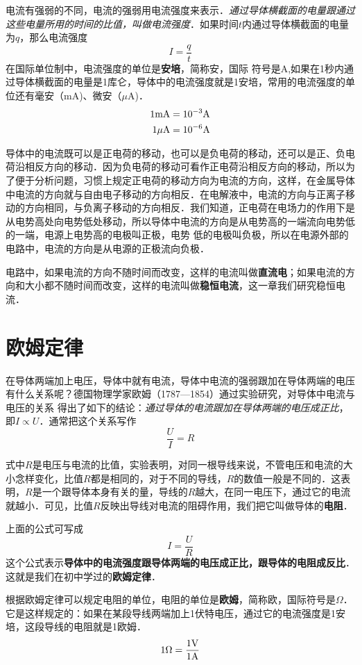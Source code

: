 电流有强弱的不同，电流的强弱用电流强度来表示．\textit{通过导体横截面的电量跟通过这些电量所用的时间的比值，叫做电流强度}．如果时间$t$内通过导体横截面的电量为$q$，那么电流强度
\[I=\frac{q}{t} \]
在国际单位制中，电流强度的单位是\textbf{安培}，简称安，国际
符号是A,如果在1秒内通过导体横截面的电量是1库仑，导体中的电流强度就是1安培，常用的电流强度的单位还有毫安（mA)、微安（$\mu$A)．
\[\begin{split}
    1{\rm mA}&= 10^{-3}{\rm A}\\
    1{\rm \mu A}&=10^{-6}{\rm A}
\end{split}\]

导体中的电流既可以是正电荷的移动，也可以是负电荷的移动，还可以是正、负电荷沿相反方向的移动．因为负电荷的移动可看作正电荷沿相反方向的移动，所以为了便于分析问题，习惯上规定正电荷的移动方向为电流的方向，这样，在金属导体中电流的方向就与自由电子移动的方向相反．在电解液中，电流的方向与正离子移动的方向相同，与负离子移动的方向相反．我们知道，正电荷在电场力的作用下是从电势高处向电势低处移动，所以导体中电流的方向是从电势高的一端流向电势低的一端，电源上电势高的电极叫正极，电势
低的电极叫负极，所以在电源外部的电路中，电流的方向是从电源的正极流向负极．

电路中，如果电流的方向不随时间而改变，这样的电流叫做\textbf{直流电}；如果电流的方向和大小都不随时间而改变，这样的电流叫做\textbf{稳恒电流}，这一章我们研究稳恒电流．

\section{欧姆定律}
在导体两端加上电压，导体中就有电流，导体中电流的强弱跟加在导体两端的电压有什么关系呢？德国物理学家欧姆（1787—1854）通过实验研究，对导体中电流与电压的关系
得出了如下的结论：\textit{通过导体的电流跟加在导体两端的电压成正比}，即$I\propto U$．通常把这个关系写作
\[\frac{U}{I}=R\]

式中$R$是电压与电流的比值，实验表明，对同一根导线来说，不管电压和电流的大小念样变化，比值$R$都是相同的，对于不同的导线，$R$的数值一般是不同的．这表明，$R$是一个跟导体本身有关的量，导线的$R$越大，在同一电压下，通过它的电流就越小．可见，比值$R$反映出导线对电流的阻碍作用，我们把它叫做导体的\textbf{电阻}．

上面的公式可写成
\[I=\frac{U}{R}\]
这个公式表示\textbf{导体中的电流强度跟导体两端的电压成正比，跟导体的电阻成反比}．这就是我们在初中学过的\textbf{欧姆定律}．

根据欧姆定律可以规定电阻的单位，电阻的单位是\textbf{欧姆}，简称欧，国际符号是$\Omega$． 它是这样规定的：如果在某段导线两端加上1伏特电压，通过它的电流强度是1安培，这段导线的电阻就是1欧姆．
\[1\Omega=\frac{1{\rm V}}{1{\rm A}} \]

